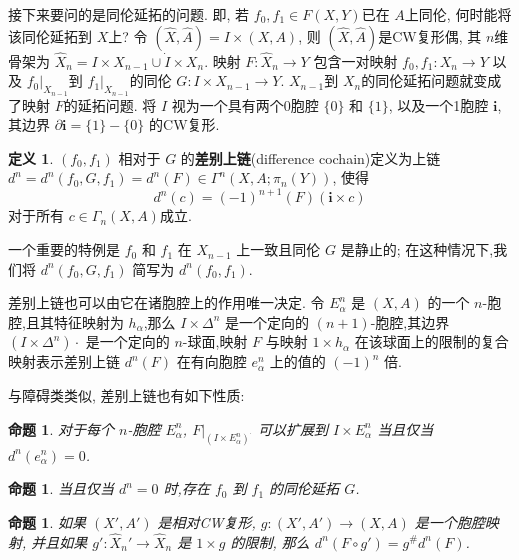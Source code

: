 \documentclass{ctexart}
\theoremstyle{plain}
\newtheorem{proposition}[theorem]{命题}
\theoremstyle{definition}
\newtheorem{definition}[theorem]{定义}
\renewcommand{\emph}{\textbf}
\begin{document}
        接下来要问的是同伦延拓的问题. 即, 若 $f_0, f_1\in F(X,Y)$已在 $A$上同伦, 何时能将该同伦延拓到 $X$上? 令 $(\hat{X}, \hat{A})=I\times (X,A)$, 则 $(\hat{X}, \hat{A})$是CW复形偶, 其 $n$维骨架为 $\hat{X}_{n}=I\times X_{n-1}\cup \dot{I}\times X_{n}$. 映射 $F:\hat{X}_{n}\to Y$ 包含一对映射 $f_0, f_1:X_{n}\to Y$ 以及 $f_0|_{X_{n-1}}$到 $f_1|_{X_{n-1}}$的同伦 $G:I\times X_{n-1}\to Y$. $X_{n-1}$到 $X_{n}$的同伦延拓问题就变成了映射 $F$的延拓问题. 将 $I$ 视为一个具有两个0胞腔 $\{0\}$ 和 $\{1\}$, 以及一个1胞腔 $\mathbf{i}$, 其边界 $\partial \mathbf{i} = \{1\} - \{0\}$ 的CW复形.
        \begin{definition}
            $(f_0,f_1)$ 相对于 $G$ 的\emph{差别上链}(difference cochain)定义为上链 $d^n = d^n(f_0, G, f_1) = d^n(F) \in \Gamma^n(X, A; \pi_n(Y))$, 使得
            $$
            d^n(c) = (-1)^{n+1} (F)(\mathbf{i} \times c)
            $$
            对于所有 $c \in \Gamma_n(X, A)$成立. 
        \end{definition}
        一个重要的特例是 $f_0$ 和 $f_1$ 在 $X_{n-1}$ 上一致且同伦 $G$ 是静止的; 在这种情况下,我们将 $d^n(f_0, G, f_1)$ 简写为 $d^n(f_0, f_1)$.

        差别上链也可以由它在诸胞腔上的作用唯一决定. 令 $E_{\alpha}^n$ 是 $(X, A)$ 的一个 $n$-胞腔,且其特征映射为 $h_{\alpha}$,那么 $I \times \Delta^n$ 是一个定向的 $(n+1)$-胞腔,其边界 $(I \times \Delta^n) \cdot$ 是一个定向的 $n$-球面,映射 $F$ 与映射 $1 \times h_{\alpha}$ 在该球面上的限制的复合映射表示差别上链 $d^n(F)$ 在有向胞腔 $e_{\alpha}^n$ 上的值的 $(-1)^n$ 倍.

        与障碍类类似, 差别上链也有如下性质:
        \begin{proposition}
            对于每个 $n$-胞腔 $E_{\alpha}^n$, $F|_{(I \times E_{\alpha}^n)^\cdot}$ 可以扩展到 $I \times E_{\alpha}^n$ 当且仅当 $d^n(e_{\alpha}^n) = 0$.
            \end{proposition}
            
            \begin{proposition}
            当且仅当 $d^n = 0$ 时,存在 $f_0$ 到 $f_1$ 的同伦延拓 $G$.
            \end{proposition}
            
            \begin{proposition}
            如果 $(X', A')$ 是相对CW复形, $g : (X', A') \to (X, A)$ 是一个胞腔映射, 并且如果 $g' : \hat{X}_n' \to \hat{X}_n$ 是 $1 \times g$ 的限制, 那么 $d^n(F \circ g') = g^\# d^n(F)$.
            \end{proposition}
            
\end{document}
